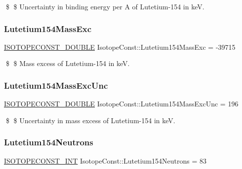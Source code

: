 \$ \$ Uncertainty in binding energy per A of Lutetium-\/154 in keV. \mbox{\label{group___isotope_const-_lutetium-_lu154_ga75bce4245e8edf36b953ec2b16579a77}} 
\subsubsection{\texorpdfstring{Lutetium154\+Mass\+Exc}{Lutetium154MassExc}}
{\footnotesize\ttfamily \mbox{\hyperlink{group___isotope_const-_macros_ga8f45a7272ce02c0b4c65c44636ed719a}{I\+S\+O\+T\+O\+P\+E\+C\+O\+N\+S\+T\+\_\+\+D\+O\+U\+B\+LE}} Isotope\+Const\+::\+Lutetium154\+Mass\+Exc = -\/39715}

\$ \$ Mass excess of Lutetium-\/154 in keV. \mbox{\label{group___isotope_const-_lutetium-_lu154_ga82db404cc0a63f4e77eaaa1d6ec9cb2f}} 
\subsubsection{\texorpdfstring{Lutetium154\+Mass\+Exc\+Unc}{Lutetium154MassExcUnc}}
{\footnotesize\ttfamily \mbox{\hyperlink{group___isotope_const-_macros_ga8f45a7272ce02c0b4c65c44636ed719a}{I\+S\+O\+T\+O\+P\+E\+C\+O\+N\+S\+T\+\_\+\+D\+O\+U\+B\+LE}} Isotope\+Const\+::\+Lutetium154\+Mass\+Exc\+Unc = 196}

\$ \$ Uncertainty in mass excess of Lutetium-\/154 in keV. \mbox{\label{group___isotope_const-_lutetium-_lu154_ga9bb369c4fb70ddbb59085b969bde504e}} 
\subsubsection{\texorpdfstring{Lutetium154\+Neutrons}{Lutetium154Neutrons}}
{\footnotesize\ttfamily \mbox{\hyperlink{group___isotope_const-_macros_ga5f18360b3e99483a35c32d789e62621c}{I\+S\+O\+T\+O\+P\+E\+C\+O\+N\+S\+T\+\_\+\+I\+NT}} Isotope\+Const\+::\+Lutetium154\+Neutrons = 83}


